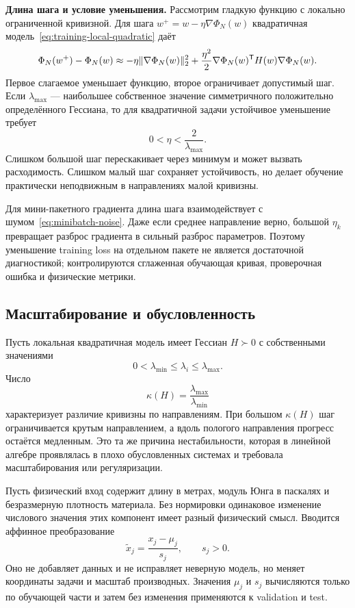 \medskip
\noindent\textbf{Длина шага и условие уменьшения.}
Рассмотрим гладкую функцию с локально ограниченной кривизной. Для шага $w^+=w-\eta\nabla\Phi_N(w)$ квадратичная модель~\eqref{eq:training-local-quadratic} даёт
\begin{equation}
 \Phi_N(w^+)-\Phi_N(w)
 \approx
 -\eta\lVert\nabla\Phi_N(w)\rVert_2^2
 +\frac{\eta^2}{2}
 \nabla\Phi_N(w)^{\mathsf{T}}H(w)\nabla\Phi_N(w).
\end{equation}
Первое слагаемое уменьшает функцию, второе ограничивает допустимый шаг. Если $\lambda_{\max}$ --- наибольшее собственное значение симметричного положительно определённого Гессиана, то для квадратичной задачи устойчивое уменьшение требует
\begin{equation}
\label{eq:quadratic-step-stability}
 0<\eta<\frac{2}{\lambda_{\max}}.
\end{equation}
Слишком большой шаг перескакивает через минимум и может вызвать расходимость. Слишком малый шаг сохраняет устойчивость, но делает обучение практически неподвижным в направлениях малой кривизны.

Для мини-пакетного градиента длина шага взаимодействует с шумом~\eqref{eq:minibatch-noise}. Даже если среднее направление верно, большой $\eta_k$ превращает разброс градиента в сильный разброс параметров. Поэтому уменьшение training loss на отдельном пакете не является достаточной диагностикой; контролируются сглаженная обучающая кривая, проверочная ошибка и физические метрики.

\subsection{Масштабирование и обусловленность}
Пусть локальная квадратичная модель имеет Гессиан $H\succ0$ с собственными значениями
\begin{equation}
 0<\lambda_{\min}\leq\lambda_i\leq\lambda_{\max}.
\end{equation}
Число
\begin{equation}
 \kappa(H)
 =
 \frac{\lambda_{\max}}{\lambda_{\min}}
\end{equation}
характеризует различие кривизны по направлениям. При большом $\kappa(H)$ шаг ограничивается крутым направлением, а вдоль пологого направления прогресс остаётся медленным. Это та же причина нестабильности, которая в линейной алгебре проявлялась в плохо обусловленных системах и требовала масштабирования или регуляризации.

Пусть физический вход содержит длину в метрах, модуль Юнга в паскалях и безразмерную плотность материала. Без нормировки одинаковое изменение числового значения этих компонент имеет разный физический смысл. Вводится аффинное преобразование
\begin{equation}
 \widetilde x_j
 =
 \frac{x_j-\mu_j}{s_j},
 \qquad
 s_j>0.
\end{equation}
Оно не добавляет данных и не исправляет неверную модель, но меняет координаты задачи и масштаб производных. Значения $\mu_j$ и $s_j$ вычисляются только по обучающей части и затем без изменения применяются к validation и test.

